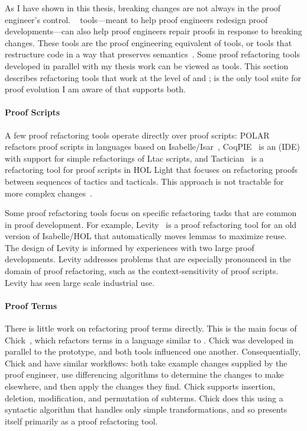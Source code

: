 As I have shown in this thesis, breaking changes are not always in the proof engineer's control.
~\cite{WhitesidePhD} tools---meant to help proof engineers redesign proof developments---can also help proof engineers
repair proofs in response to breaking changes.
These tools are the proof engineering equivalent of  tools, or tools
that restructure code in a way that preserves semantics~\cite{opdyke1992}.
Some proof refactoring tools developed in parallel with my thesis work can be viewed as  tools.
This section describes refactoring tools that work at the level of  and ;
\sysnamelong is the only tool suite for proof evolution I am aware of that supports both.

\paragraph{Proof Scripts}
A few proof refactoring tools operate directly over proof scripts:
\textsc{POLAR}~\cite{Dietrich2013} refactors proof scripts in languages based on Isabelle/Isar~\cite{Wenzel2007isar},
CoqPIE~\cite{Roe2016} is an  (IDE) with support for simple refactorings of Ltac scripts, and
Tactician~\cite{adams2015} is a refactoring tool for proof scripts in HOL Light
that focuses on refactoring proofs between sequences of tactics and tacticals.
This approach is not tractable for more complex changes~\cite{robert2018}.

Some proof refactoring tools focus on specific refactoring tasks that are common in proof development.
For example, Levity~\cite{Bourke12} is a proof refactoring tool for an old version of Isabelle/HOL that automatically
moves lemmas to maximize reuse. The design of Levity is informed by experiences with two large proof developments.
Levity addresses problems that are especially pronounced in the domain of proof refactoring, such as the
context-sensitivity of proof scripts. Levity has seen large scale industrial use.
 
\paragraph{Proof Terms}
There is little work on refactoring proof terms directly. This is the main focus of Chick~\cite{robert2018}, 
which refactors terms in a language similar to .
Chick was developed in parallel to the \sysname prototype, and both tools influenced one another.
Consequentially, Chick and \sysnamelong have similar workflows:
both take example changes supplied by the proof engineer,
use differencing algorithms to determine the changes to make elsewhere,
and then apply the changes they find. 
Chick supports insertion, deletion, modification, and permutation of subterms.
Chick does this using a syntactic algorithm that handles only simple transformations,
and so presents itself primarily as a proof refactoring tool.

